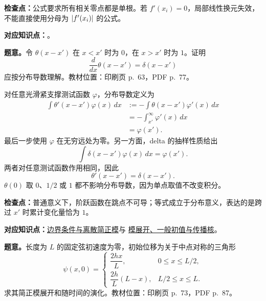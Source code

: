\textbf{检查点：}公式要求所有相关零点都是单根。若 $f'(x_i)=0$，局部线性换元失效，不能直接使用分母为 $\left|f'(x_i)\right|$ 的公式。


\textbf{对应知识点：}。

\textbf{题意。}令 $\theta(x-x')$ 在 $x<x'$ 时为 $0$，在 $x>x'$ 时为 $1$。证明
\[
  \frac{d}{dx}\theta(x-x')=\delta(x-x')
\]
应按分布导数理解。教材位置：印刷页 p.~63，PDF p.~77。

\begin{checkedsolution}
对任意光滑紧支撑测试函数 $\varphi$，分布导数定义为
\begin{align*}
  \int\theta'(x-x')\varphi(x)\,dx
  &:=-\int\theta(x-x')\varphi'(x)\,dx\\
  &=-\int_{x'}^{\infty}\varphi'(x)\,dx\\
  &=\varphi(x').
\end{align*}
最后一步使用 $\varphi$ 在无穷远处为零。另一方面，delta 的抽样性质给出
\[
  \int\delta(x-x')\varphi(x)\,dx=\varphi(x').
\]
两者对任意测试函数作用相同，因此
\[
  \boxed{\theta'(x-x')=\delta(x-x')}.
\]
$\theta(0)$ 取 $0$、$1/2$ 或 $1$ 都不影响分布导数，因为单点取值不改变积分。
\end{checkedsolution}

\textbf{检查点：}普通意义下，阶跃函数在跳点不可导；等式成立于分布意义，表达的是跨过 $x'$ 时累计变化量恰为 $1$。


\textbf{对应知识点：}\hyperref[topic:QM-C01-S10-T07]{边界条件与离散简正模}与
\hyperref[topic:QM-C01-S10-T08]{模展开、一般初值与传播核}。

\textbf{题意。}长度为 $L$ 的固定弦初速度为零，初始位移为关于中点对称的三角形
\[
  \psi(x,0)=
  \begin{cases}
    \dfrac{2hx}{L},&0\leq x\leq L/2,\\[4pt]
    \dfrac{2h}{L}(L-x),&L/2\leq x\leq L.
  \end{cases}
\]
求其简正模展开和随时间的演化。教材位置：印刷页 p.~73，PDF p.~87。

